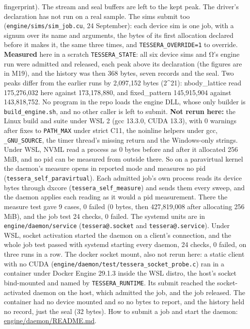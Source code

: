 \begin{description}
fingerprint). The stream and seal buffers are left to the kept peak. The driver's declaration has not run on a real sample. The sims submit too (\texttt{engine/\allowbreak{}sims/\allowbreak{}sim\_\allowbreak{}job.\allowbreak{}cu}, 24 September): each device sim is one job, with a signum over its name and arguments, the bytes of its first allocation declared before it makes it, the same three times, and \texttt{TESSERA\_\allowbreak{}OVERRIDE=1} to override. \textbf{Measured} here in a scratch \texttt{TESSERA\_\allowbreak{}STATE}: all six device sims and Ω's engine run were admitted and released, each peak above its declaration (the figures are in M19), and the history was then 368 bytes, seven records and the seal. Two peaks differ from the earlier runs by 2,097,152 bytes (2\textasciicircum{}21): nbody\_\allowbreak{}lattice read 175,276,032 here against 173,178,880, and fixed\_\allowbreak{}pattern 145,915,904 against 143,818,752. No program in the repo loads the engine DLL, whose only builder is \texttt{build\_\allowbreak{}engine.\allowbreak{}sh}, and no other caller is left to submit. \textbf{Not rerun here:} the Linux build and suite under WSL 2 (gcc 13.3.0, CUDA 13.3), with 0 warnings after fixes to \texttt{PATH\_\allowbreak{}MAX} under strict C11, the noinline helpers under gcc, \texttt{\_\allowbreak{}GNU\_\allowbreak{}SOURCE}, the timer thread's missing return and the Windows-only strings. Under WSL, NVML read a process as 0 bytes before and after it allocated 256 MiB, and no pid can be measured from outside there. So on a paravirtual kernel the daemon's measure opens in reported mode and measures no pid (\texttt{tessera\_\allowbreak{}self\_\allowbreak{}paravirtual}). Each admitted job's own process reads its device bytes through dxcore (\texttt{tessera\_\allowbreak{}self\_\allowbreak{}measure}) and sends them every sweep, and the daemon applies each reading as it would a pid measurement. There the measure test gave 9 cases, 0 failed (0 bytes, then 427,819,008 after allocating 256 MiB), and the job test 24 checks, 0 failed. The systemd units are in \texttt{engine/\allowbreak{}daemon/\allowbreak{}service} (\texttt{tessera@.\allowbreak{}socket} and \texttt{tessera@.\allowbreak{}service}). Under WSL, socket activation started the daemon on a client's connection, and the whole job test passed with systemd starting every daemon, 24 checks, 0 failed, on three runs in a row. The docker socket mount, also not rerun here: a static client with no CUDA (\texttt{engine/\allowbreak{}daemon/\allowbreak{}test/\allowbreak{}tessera\_\allowbreak{}socket\_\allowbreak{}probe.\allowbreak{}c}) ran in a container under Docker Engine 29.1.3 inside the WSL distro, the host's socket bind-mounted and named by \texttt{TESSERA\_\allowbreak{}RUNTIME}. Its submit reached the socket-activated daemon on the host, which admitted the job, and the job released. The container had no device mounted and so no bytes to report, and the history held no record, just the seal (32 bytes). How to submit a job and start the daemon: \href{https://github.com/dstroy0/cell_tracking/blob/main/engine/daemon/README.md}{engine/daemon/README.md}.

\end{description}
